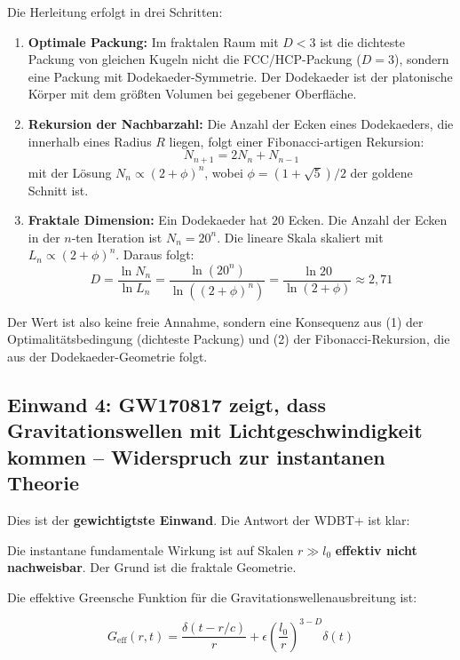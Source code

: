 \documentclass[12pt,a4paper]{article}
\begin{document}
Die Herleitung erfolgt in drei Schritten:

\begin{enumerate}
\item \textbf{Optimale Packung:} Im fraktalen Raum mit $D < 3$ ist die dichteste Packung von gleichen Kugeln nicht die FCC/HCP-Packung ($D=3$), sondern eine Packung mit Dodekaeder-Symmetrie. Der Dodekaeder ist der platonische Körper mit dem größten Volumen bei gegebener Oberfläche.

\item \textbf{Rekursion der Nachbarzahl:} Die Anzahl der Ecken eines Dodekaeders, die innerhalb eines Radius $R$ liegen, folgt einer Fibonacci-artigen Rekursion:
\begin{equation}
N_{n+1} = 2N_n + N_{n-1}
\end{equation}
mit der Lösung $N_n \propto (2+\phi)^n$, wobei $\phi = (1+\sqrt{5})/2$ der goldene Schnitt ist.

\item \textbf{Fraktale Dimension:} Ein Dodekaeder hat $20$ Ecken. Die Anzahl der Ecken in der $n$-ten Iteration ist $N_n = 20^n$. Die lineare Skala skaliert mit $L_n \propto (2+\phi)^n$. Daraus folgt:
\begin{equation}
D = \frac{\ln N_n}{\ln L_n} = \frac{\ln(20^n)}{\ln((2+\phi)^n)} = \frac{\ln 20}{\ln(2+\phi)} \approx 2,71
\end{equation}
\end{enumerate}

Der Wert ist also keine freie Annahme, sondern eine Konsequenz aus (1) der Optimalitätsbedingung (dichteste Packung) und (2) der Fibonacci-Rekursion, die aus der Dodekaeder-Geometrie folgt.

\subsection{Einwand 4: GW170817 zeigt, dass Gravitationswellen mit Lichtgeschwindigkeit kommen -- Widerspruch zur instantanen Theorie}

Dies ist der \textbf{gewichtigtste Einwand}. Die Antwort der WDBT+ ist klar:

Die instantane fundamentale Wirkung ist auf Skalen $r \gg l_0$ \textbf{effektiv nicht nachweisbar}. Der Grund ist die fraktale Geometrie.

Die effektive Greensche Funktion für die Gravitationswellenausbreitung ist:

\begin{equation}
G_{\text{eff}}(r,t) = \frac{\delta(t - r/c)}{r} + \epsilon \left(\frac{l_0}{r}\right)^{3-D} \delta(t)
\end{equation}
\end{document}
